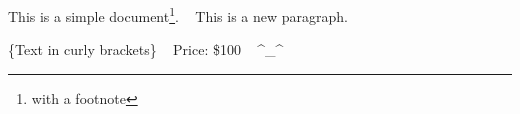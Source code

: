 \documentclass[a4paper,12pt]{article}
\begin{document}
This is a simple document\footnote{with a footnote}. ~ This is a new paragraph.

\{Text in curly brackets\} ~ Price: \$100 ~ \textasciicircum\_\textasciicircum
\end{document}
